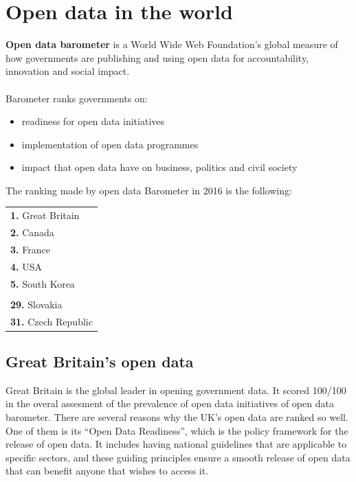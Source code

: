 \documentclass[thesis=B,english]{sprlajur-slovakopendata}[2018/05/12]
\begin{document}
\section{Open data in the world}
\label{worldopendata}
\textbf{Open data barometer} is a World Wide Web Foundation's global measure of how governments are publishing and using open data for accountability, innovation and social impact.\cite{opendatabarometer} \paragraph{} Barometer ranks governments on:
\begin{itemize}
	\item readiness for open data initiatives
	\item implementation of open data programmes
	\item impact that open data have on business, politics and civil society
\end{itemize}
The ranking made by open data Barometer in 2016 is the following:
\begin{center}
	\begin{tabular}{l}
		\textbf{1.} Great Britain   \\
		\textbf{2.} Canada          \\
		\textbf{3.} France          \\
		\textbf{4.} USA             \\
		\textbf{5.} South Korea     \\
		                            \\
		\textbf{29.} Slovakia       \\
		\textbf{31.} Czech Republic \\
	\end{tabular}
\end{center}
\subsection{Great Britain's open data}
Great Britain is the global leader in opening government data. It scored 100/100 in the overal assesment of the prevalence of open data initiatives of open data barometer.
There are several reasons why the UK's open data are ranked so well. One of them is its ``Open Data Readiness'', which is the policy framework for the release of open data. It includes having national guidelines that are applicable to specific sectors, and these guiding principles ensure a smooth release of open data that can benefit anyone that wishes to access it.
\end{document}
